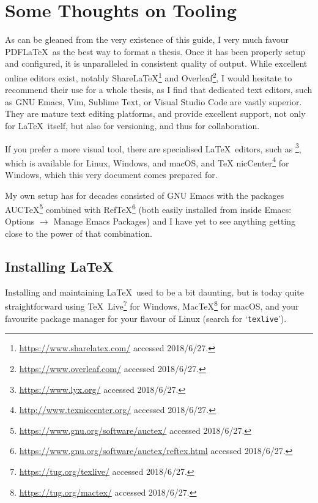 
\chapter*{Some Thoughts on Tooling}
\label{cha:some-thoughts-tool}


As can be gleaned from the very existence of this guide, I very much
favour PDF\LaTeX\ as the best way to format a thesis. Once it has been
properly setup and configured, it is unparalleled in consistent
quality of output.  While excellent online editors exist, notably
Share\LaTeX\footnote{\url{https://www.sharelatex.com/} accessed 2018/6/27.} and
Overleaf\footnote{\url{https://www.overleaf.com/} accessed 2018/6/27.}, I would hesitate
to recommend their use for a whole thesis, as I find that dedicated
text editors, such as GNU Emacs, Vim, Sublime Text, or Visual Studio
Code are vastly superior.  They are mature text editing platforms, and
provide excellent support, not only for \LaTeX\ itself, but also for
versioning, and thus for collaboration.

If you prefer a more visual tool, there are specialised \LaTeX\
editors, such as \mLyX\footnote{\url{https://www.lyx.org/} accessed 2018/6/27.}, which is
available for Linux, Windows, and macOS, and \TeX
nicCenter\footnote{\url{http://www.texniccenter.org/} accessed 2018/6/27.} for Windows,
which this very document comes prepared for.

My own setup has for decades consisted of GNU Emacs with the packages
AUC\TeX\footnote{\url{https://www.gnu.org/software/auctex/} accessed 2018/6/27.} combined
with
Ref\TeX\footnote{\url{https://www.gnu.org/software/auctex/reftex.html} accessed 2018/6/27.}
(both easily installed from inside Emacs: Options $\rightarrow$ Manage
Emacs Packages) and I have yet to see anything getting close to the
power of that combination.

\section*{Installing \LaTeX}
\label{sec:installing-latex}

Installing and maintaining \LaTeX\ used to be a bit daunting, but is today
quite straightforward using \TeX\
Live\footnote{\url{https://tug.org/texlive/} accessed 2018/6/27.} for Windows,
Mac\TeX\footnote{\url{https://tug.org/mactex/} accessed 2018/6/27.} for mac\-OS, and your
favourite package manager for your flavour of Linux (search for `\texttt{texlive}').

